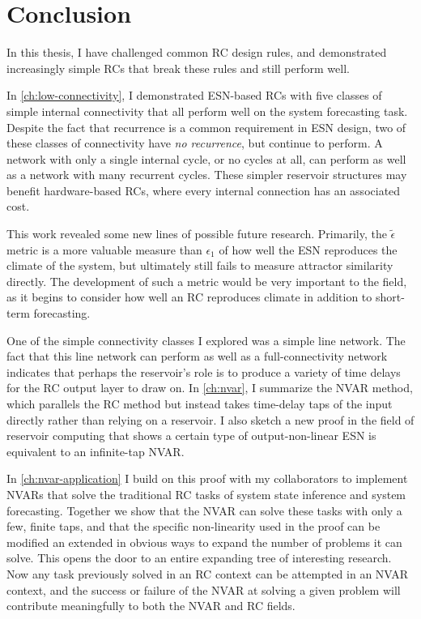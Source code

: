 \chapter{Conclusion}\label{ch:conclusion}

In this thesis, I have challenged common RC design rules, and
demonstrated increasingly simple RCs that break these rules and still
perform well.

In \cref{ch:low-connectivity}, I demonstrated ESN-based RCs with five
classes of simple internal connectivity that all perform well on the
system forecasting task. Despite the fact that recurrence is a common
requirement in ESN design, two of these classes of connectivity have
\emph{no recurrence}, but continue to perform. A network with only a
single internal cycle, or no cycles at all, can perform as well as a
network with many recurrent cycles. These simpler reservoir structures
may benefit hardware-based RCs, where every internal connection has an
associated cost.

This work revealed some new lines of possible future
research. Primarily, the $\tilde{\epsilon}$ metric is a more valuable
measure than $\epsilon_1$ of how well the ESN reproduces the climate
of the system, but ultimately still fails to measure attractor
similarity directly. The development of such a metric would be very
important to the field, as it begins to consider how well an RC
reproduces climate in addition to short-term forecasting.

One of the simple connectivity classes I explored was a simple line
network. The fact that this line network can perform as well as a
full-connectivity network indicates that perhaps the reservoir's role
is to produce a variety of time delays for the RC output layer to draw
on. In \cref{ch:nvar}, I summarize the NVAR method, which parallels
the RC method but instead takes time-delay taps of the input directly
rather than relying on a reservoir. I also sketch a new proof in the
field of reservoir computing that shows a certain type of
output-non-linear ESN is equivalent to an infinite-tap NVAR.

In \cref{ch:nvar-application} I build on this proof with my
collaborators to implement NVARs that solve the traditional RC tasks
of system state inference and system forecasting. Together we show
that the NVAR can solve these tasks with only a few, finite taps, and
that the specific non-linearity used in the proof can be modified an
extended in obvious ways to expand the number of problems it can
solve. This opens the door to an entire expanding tree of interesting
research. Now any task previously solved in an RC context can be
attempted in an NVAR context, and the success or failure of the NVAR
at solving a given problem will contribute meaningfully to both the
NVAR and RC fields.

